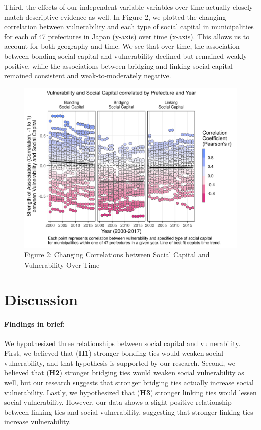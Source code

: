 \documentclass[]{elsarticle} %
\newcommand{\blandscape}{\begin{landscape}}
\newcommand{\elandscape}{\end{landscape}}
\begin{document}
Third, the effects of our independent variable variables over time
actually closely match descriptive evidence as well. In Figure 2, we
plotted the changing correlation between vulnerability and each type of
social capital in municipalities for each of 47 prefectures in Japan
(y-axis) over time (x-axis). This allows us to account for both
geography and time. We see that over time, the association between
bonding social capital and vulnerability declined but remained weakly
positive, while the associations between bridging and linking social
capital remained consistent and weak-to-moderately negative.

\newpage
\blandscape

\begin{figure}
\includegraphics[width=1\linewidth]{fig2_correlation} \caption{Figure 2: Changing Correlations between Social Capital and Vulnerability Over Time}\label{fig:fig2}
\end{figure}

\elandscape
\newpage

\hypertarget{discussion}{%
\section{Discussion}\label{discussion}}

\hypertarget{findings-in-brief}{%
\paragraph{Findings in brief:}\label{findings-in-brief}}

We hypothesized three relationships between social capital and
vulnerability. First, we believed that (\textbf{H1}) stronger bonding
ties would weaken social vulnerability, and that hypothesis is supported
by our research. Second, we believed that (\textbf{H2}) stronger
bridging ties would weaken social vulnerability as well, but our
research suggests that stronger bridging ties actually increase social
vulnerability. Lastly, we hypothesized that (\textbf{H3}) stronger
linking ties would lessen social vulnerability. However, our data shows
a slight positive relationship between linking ties and social
vulnerability, suggesting that stronger linking ties increase
vulnerability.
\end{document}
